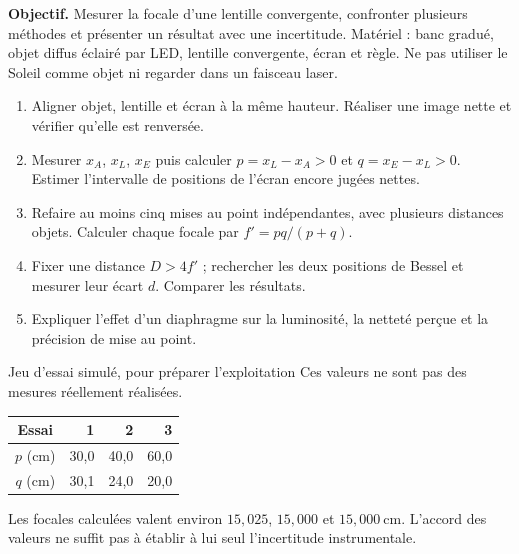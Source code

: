 \textbf{Objectif.} Mesurer la focale d'une lentille convergente, confronter plusieurs méthodes et présenter un résultat avec une incertitude. Matériel : banc gradué, objet diffus éclairé par LED, lentille convergente, écran et règle. Ne pas utiliser le Soleil comme objet ni regarder dans un faisceau laser.
\begin{enumerate}
\item Aligner objet, lentille et écran à la même hauteur. Réaliser une image nette et vérifier qu'elle est renversée.
\item Mesurer $x_A$, $x_L$, $x_E$ puis calculer $p=x_L-x_A>0$ et $q=x_E-x_L>0$. Estimer l'intervalle de positions de l'écran encore jugées nettes.
\item Refaire au moins cinq mises au point indépendantes, avec plusieurs distances objets. Calculer chaque focale par $f'=pq/(p+q)$.
\item Fixer une distance $D>4f'$ ; rechercher les deux positions de Bessel et mesurer leur écart $d$. Comparer les résultats.
\item Expliquer l'effet d'un diaphragme sur la luminosité, la netteté perçue et la précision de mise au point.
\end{enumerate}
\begin{docu}{Jeu d'essai simulé, pour préparer l'exploitation}
Ces valeurs ne sont pas des mesures réellement réalisées.
\begin{center}\begin{tabular}{c r r r}
\toprule Essai & 1 & 2 & 3\\\midrule
$p$ (cm)&30,0&40,0&60,0\\
$q$ (cm)&30,1&24,0&20,0\\\bottomrule
\end{tabular}\end{center}
Les focales calculées valent environ $15{,}025$, $15{,}000$ et $15{,}000\ \mathrm{cm}$. L'accord des valeurs ne suffit pas à établir à lui seul l'incertitude instrumentale.
\end{docu}

